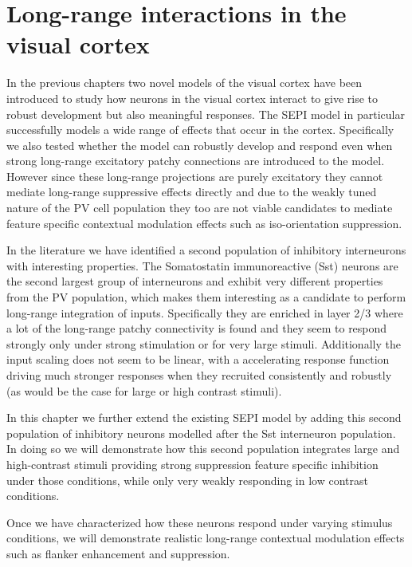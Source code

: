 \chapter{Long-range interactions in the visual cortex}

In the previous chapters two novel models of the visual cortex have
been introduced to study how neurons in the visual cortex interact to
give rise to robust development but also meaningful responses. The
SEPI model in particular successfully models a wide range of effects
that occur in the cortex. Specifically we also tested whether the
model can robustly develop and respond even when strong long-range
excitatory patchy connections are introduced to the model. However
since these long-range projections are purely excitatory they cannot
mediate long-range suppressive effects directly and due to the weakly
tuned nature of the PV cell population they too are not viable
candidates to mediate feature specific contextual modulation effects
such as iso-orientation suppression.

In the literature we have identified a second population of inhibitory
interneurons with interesting properties. The Somatostatin
immunoreactive (Sst) neurons are the second largest group of
interneurons and exhibit very different properties from the PV
population, which makes them interesting as a candidate to perform
long-range integration of inputs. Specifically they are enriched in
layer 2/3 where a lot of the long-range patchy connectivity is found
and they seem to respond strongly only under strong stimulation or for
very large stimuli. Additionally the input scaling does not seem to be
linear, with a accelerating response function driving much stronger
responses when they recruited consistently and robustly (as would be
the case for large or high contrast stimuli).

In this chapter we further extend the existing SEPI model by adding
this second population of inhibitory neurons modelled after the Sst
interneuron population. In doing so we will demonstrate how this
second population integrates large and high-contrast stimuli providing
strong suppression feature specific inhibition under those conditions,
while only very weakly responding in low contrast conditions.

Once we have characterized how these neurons respond under varying
stimulus conditions, we will demonstrate realistic long-range
contextual modulation effects such as flanker enhancement and
suppression.

